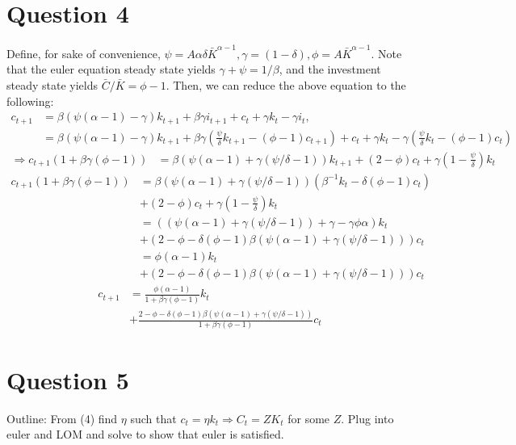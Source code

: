 \documentclass[11pt]{article} %
\begin{document}
\section{Question 4}
Define, for sake of convenience, $\psi = A\alpha\delta \bar{K}^{\alpha-1}, \gamma = (1-\delta), \phi = A\bar{K}^{\alpha - 1}$. Note that the euler equation steady state yields $\gamma + \psi = 1/\beta$, and the investment steady state yields $\bar{C}/\bar{K} = \phi - 1$. Then, we can reduce the above equation to the following:
\begin{align*}
c_{t+1} &= \beta(\psi (\alpha - 1) - \gamma)k_{t+1} + \beta\gamma i_{t+1} + c_t + \gamma k_t - \gamma i_t,\\
&= \beta(\psi (\alpha - 1) - \gamma)k_{t+1} + \beta\gamma\left(\frac{\psi}{\delta}k_{t+1} - (\phi - 1)c_{t+1} \right)  + c_t + \gamma k_t - \gamma \left( \frac{\psi}{\delta}k_t - (\phi - 1)c_t \right)
\end{align*}
\begin{align*}
\Rightarrow c_{t+1}\left( 1 + \beta\gamma (\phi - 1)\right) &=  \beta(\psi (\alpha - 1) + \gamma(\psi/\delta - 1))k_{t+1}   +(2 - \phi) c_t +  \gamma\left( 1-\frac{\psi}{\delta} \right)k_t 
\end{align*}
\begin{align*}
c_{t+1}\left( 1 + \beta\gamma (\phi - 1)\right)  &=  \beta(\psi (\alpha - 1) + \gamma(\psi/\delta - 1))\left( \beta^{-1}k_t - \delta(\phi - 1)c_t \right)\\ &+(2 - \phi) c_t +  \gamma\left( 1-\frac{\psi}{\delta}  \right)k_t \\
&= ((\psi (\alpha - 1) + \gamma(\psi/\delta - 1)) + \gamma - \gamma\phi\alpha)k_t \\&+ (2 - \phi - \delta(\phi - 1)\beta (\psi (\alpha - 1) + \gamma(\psi/\delta - 1)))c_t\\
&= \phi(\alpha - 1)k_t \\&+ (2 - \phi - \delta(\phi - 1)\beta (\psi (\alpha - 1) + \gamma(\psi/\delta - 1)))c_t
\end{align*}
\begin{align*}
c_{t+1} &= \frac{\phi(\alpha - 1)}{1 + \beta\gamma (\phi - 1)}k_{t}\\ &+ \frac{2 - \phi - \delta(\phi - 1)\beta (\psi (\alpha - 1) + \gamma(\psi/\delta - 1))}{1 + \beta\gamma (\phi - 1)}c_t
\end{align*}

\section{Question 5}
Outline: From (4) find $\eta$ such that $c_t = \eta k_t \Rightarrow C_t = ZK_t$ for some $Z$. Plug into euler and LOM and solve to show that euler is satisfied.
\end{document}
